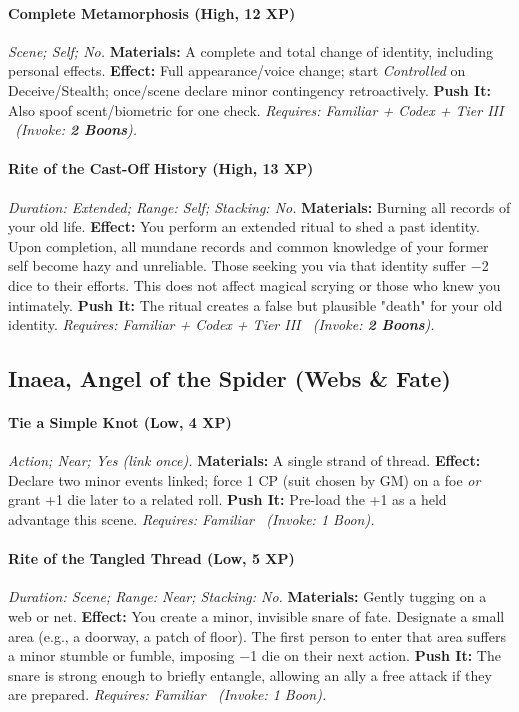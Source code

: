 \documentclass[12pt,twoside]{book}
\begin{document}
\paragraph{Complete Metamorphosis (High, 12 XP)} \emph{Scene; Self; No.}
\textbf{Materials:} A complete and total change of identity, including personal effects.
\textbf{Effect:} Full appearance/voice change; start \emph{Controlled} on Deceive/Stealth; once/scene declare minor contingency retroactively.
\textbf{Push It:} Also spoof scent/biometric for one check.
\emph{Requires: Familiar + Codex + Tier III \ (\textit{Invoke:} \textbf{2 Boons}).}
\paragraph{Rite of the Cast-Off History (High, 13 XP)} \emph{Duration: Extended; Range: Self; Stacking: No.}
\textbf{Materials:} Burning all records of your old life.
\textbf{Effect:} You perform an extended ritual to shed a past identity. Upon completion, all mundane records and common knowledge of your former self become hazy and unreliable. Those seeking you via that identity suffer −2 dice to their efforts. This does not affect magical scrying or those who knew you intimately.
\textbf{Push It:} The ritual creates a false but plausible "death" for your old identity.
\emph{Requires: Familiar + Codex + Tier III \ (\textit{Invoke:} \textbf{2 Boons}).}

\subsection{Inaea, Angel of the Spider (Webs \& Fate)}
\paragraph{Tie a Simple Knot (Low, 4 XP)} \emph{Action; Near; Yes (link once).}
\textbf{Materials:} A single strand of thread.
\textbf{Effect:} Declare two minor events linked; force 1 CP (suit chosen by GM) on a foe \emph{or} grant +1 die later to a related roll.
\textbf{Push It:} Pre-load the +1 as a held advantage this scene.
\emph{Requires: Familiar \ (\textit{Invoke:} 1 Boon).}
\paragraph{Rite of the Tangled Thread (Low, 5 XP)} \emph{Duration: Scene; Range: Near; Stacking: No.}
\textbf{Materials:} Gently tugging on a web or net.
\textbf{Effect:} You create a minor, invisible snare of fate. Designate a small area (e.g., a doorway, a patch of floor). The first person to enter that area suffers a minor stumble or fumble, imposing −1 die on their next action.
\textbf{Push It:} The snare is strong enough to briefly entangle, allowing an ally a free attack if they are prepared.
\emph{Requires: Familiar \ (\textit{Invoke:} 1 Boon).}
\end{document}
